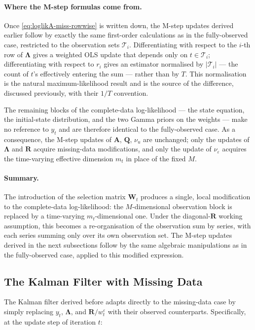\documentclass[11pt, a4paper, oneside]{article}
\newcommand{\mL}{\boldsymbol{\Lambda}}
\newcommand{\mA}{\mathbf{A}}
\newcommand{\mR}{\mathbf{R}}
\newcommand{\mQ}{\mathbf{Q}}
\begin{document}
\paragraph{Where the M-step formulas come from.}
Once \eqref{eq:loglikA-miss-rowwise} is written down, the M-step
updates derived earlier follow by exactly the
same first-order calculations as in the fully-observed case,
restricted to the observation sets $\mathcal{T}_i$. Differentiating
with respect to the $i$-th row of $\mL$ gives a weighted OLS update
that depends only on $t \in \mathcal{T}_i$; differentiating with
respect to $r_i$ gives an estimator normalised by $|\mathcal{T}_i|$
— the count of $t$'s effectively entering the sum — rather than by
$T$. This normalisation is the natural maximum-likelihood result and
is the source of the difference, discussed previously, with
their $1/T$ convention.

The remaining blocks of the complete-data log-likelihood —
the state equation, the initial-state distribution, and the two Gamma
priors on the weights — make no reference to $y_t$ and are therefore
identical to the fully-observed case. As a consequence, the M-step
updates of $\mA$, $\mQ$, $\nu_u$ are unchanged; only the updates of
$\mL$ and $\mR$ acquire missing-data modifications, and only the
update of $\nu_\varepsilon$ acquires the time-varying effective
dimension $m_t$ in place of the fixed $M$.

\paragraph{Summary.}
The introduction of the selection matrix $\mathbf{W}_t$ produces a
single, local modification to the complete-data log-likelihood: the
$M$-dimensional observation block is replaced by a time-varying
$m_t$-dimensional one. Under the diagonal-$\mR$ working assumption,
this becomes a re-organisation of the observation sum by series, with
each series summing only over its own observation set. The M-step
updates derived in the next subsections follow by the same algebraic
manipulations as in the fully-observed case, applied to this modified
expression.


\newpage 

\subsection{The Kalman Filter with Missing Data}
\label{subsec:kf-missing}

The Kalman filter derived before adapts
directly to the missing-data case by simply replacing $y_t$,
$\mL$, and $\mathbf{R}/w^\varepsilon_t$ with their observed
counterparts. Specifically, at the update step of iteration $t$:
\end{document}
